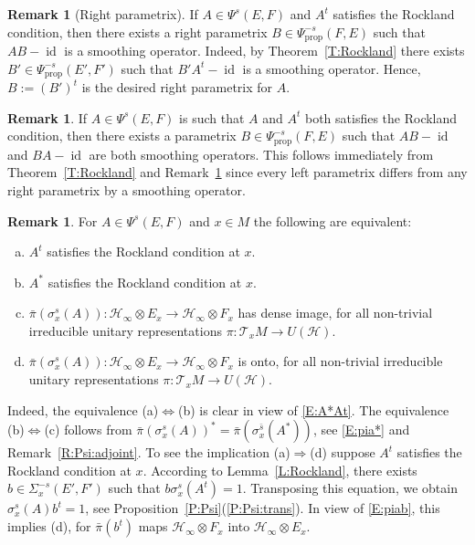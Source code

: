 \documentclass[reqno,12pt]{amsart}
\DeclareMathOperator{\id}{id}
\newcommand\prop{\textrm{prop}}
\newcommand\itemref[1]{(\ref{#1})}
\theoremstyle{plain}
\theoremstyle{definition}
\newtheorem{remark}[theorem]{Remark}
\begin{document}
\begin{remark}[Right parametrix]\label{R:rightpara}
If $A\in\Psi^s(E,F)$ and $A^t$ satisfies the Rockland condition, then there exists a right parametrix $B\in\Psi_\prop^{-s}(F,E)$ such that $AB-\id$ is a smoothing operator.
Indeed, by Theorem~\ref{T:Rockland} there exists $B'\in\Psi_\prop^{-s}(E',F')$ such that $B'A^t-\id$ is a smoothing operator.
Hence, $B:=(B')^t$ is the desired right parametrix for $A$.
\end{remark}


\begin{remark}\label{R:AAtRock}
If $A\in\Psi^s(E,F)$ is such that $A$ and $A^t$ both satisfies the Rockland condition, then there exists a parametrix $B\in\Psi_\prop^{-s}(F,E)$ such that $AB-\id$ and $BA-\id$ are both smoothing operators.
This follows immediately from Theorem~\ref{T:Rockland} and Remark~\ref{R:rightpara} since every left parametrix differs from any right parametrix by a smoothing operator.
\end{remark}


\begin{remark}\label{R:AtRock}
For $A\in\Psi^s(E,F)$ and $x\in M$ the following are equivalent:
\begin{enumerate}[(a)]
\item $A^t$ satisfies the Rockland condition at $x$.
\item $A^*$ satisfies the Rockland condition at $x$.
\item $\bar\pi(\sigma_x^s(A))\colon\mathcal H_\infty\otimes E_x\to\mathcal H_\infty\otimes F_x$ has dense image, for all non-trivial irreducible unitary representations $\pi\colon\mathcal T_xM\to U(\mathcal H)$.
\item $\bar\pi(\sigma_x^s(A))\colon\mathcal H_\infty\otimes E_x\to\mathcal H_\infty\otimes F_x$ is onto, for all non-trivial irreducible unitary representations $\pi\colon\mathcal
 T_xM\to U(\mathcal H)$.
\end{enumerate}
Indeed, the equivalence (a)$\Leftrightarrow$(b) is clear in view of \eqref{E:A*At}.
The equivalence (b)$\Leftrightarrow$(c) follows from $\bar\pi(\sigma^s_x(A))^*=\bar\pi(\sigma^{\bar s}_x(A^*))$, see \eqref{E:pia*} and Remark~\ref{R:Psi:adjoint}.
To see the implication (a)$\Rightarrow$(d) suppose $A^t$ satisfies the Rockland condition at $x$.
According to Lemma~\ref{L:Rockland}, there exists $b\in\Sigma^{-s}_x(E',F')$ such that $b\sigma^s_x(A^t)=1$.
Transposing this equation, we obtain $\sigma^s_x(A)b^t=1$, see Proposition~\ref{P:Psi}\itemref{P:Psi:trans}.
In view of \eqref{E:piab}, this implies (d), for $\bar\pi(b^t)$ maps $\mathcal H_\infty\otimes F_x$ into $\mathcal H_\infty\otimes E_x$.
\end{remark}
\end{document}
